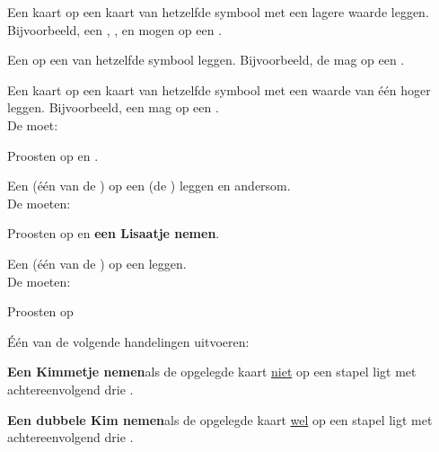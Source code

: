 \newpage
{}

\label{sec:zettenLang}


\item Een kaart op een kaart van hetzelfde symbool met een lagere waarde leggen. Bijvoorbeeld, een , ,  en  mogen op een .
\label{zet:hoger}
\eindLijst{}

\vervolgLijstKlein{}
\item Een  op een  van hetzelfde symbool leggen. Bijvoorbeeld, de  mag op een .
\eindLijst{}

\vervolgLijstKlein{}
\item Een kaart op een kaart van hetzelfde symbool met een waarde van \'e\'en hoger leggen. Bijvoorbeeld, een  mag op een . \\De \huidigeSpeler moet:
\puntLijst{}
\item Proosten op  en \FritsenN\footnotemark[1].
\eindPuntLijst{}
\label{zet:offer_frits}
\eindLijst{}

\vervolgLijstKlein{}
\item \label{zet:lisa} Een  (\'e\'en van de ) op een  (de ) leggen en andersom. \\ De \andereSpelers moeten:
\puntLijst{}
\item Proosten op  en \textbf{een Lisaatje nemen}\footnotemark[2].
\eindPuntLijst{}
\eindLijst{}

\vervolgLijstKlein{}
\item \label{zet:kim} Een  (\'e\'en van de ) op een  leggen. \\De \andereSpelers moeten:
\puntLijst{}
\item Proosten op 
\item Één van de volgende handelingen uitvoeren:
\numeriekeLijst{}
\item \textbf{Een Kimmetje nemen}\footnotemark[3] als de opgelegde kaart \ul{niet} op een stapel ligt met \\achtereenvolgend drie .
\item \textbf{Een dubbele Kim nemen}\footnotemark[4] als de opgelegde kaart \ul{wel} op een stapel ligt met \\achtereenvolgend drie .
\eindNumeriekeLijst{}
\eindPuntLijst{}
\eindLijst{}


